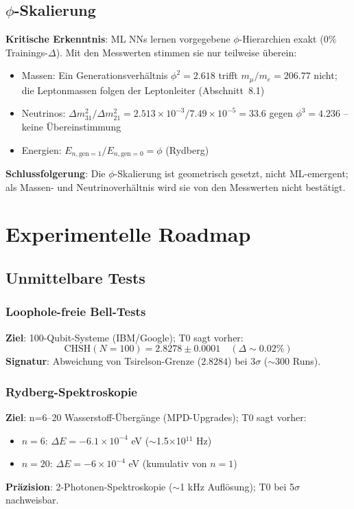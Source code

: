 	\subsection{$\phi$-Skalierung}
	
	\textbf{Kritische Erkenntnis}: ML NNs lernen vorgegebene $\phi$-Hierarchien exakt (0\% Trainings-$\Delta$). Mit den Messwerten stimmen sie nur teilweise überein:
	\begin{itemize}
		\item Massen: Ein Generationsverhältnis $\phi^2 = 2.618$ trifft $m_\mu/m_e = 206.77$ nicht; die Leptonmassen folgen der Leptonleiter (Abschnitt~8.1)
		\item Neutrinos: $\Delta m_{31}^2/\Delta m_{21}^2 = 2.513\times10^{-3}/7.49\times10^{-5} = 33.6$ gegen $\phi^3 = 4.236$ -- keine Übereinstimmung
		\item Energien: $E_{n,\text{gen}=1} / E_{n,\text{gen}=0} = \phi$ (Rydberg)
	\end{itemize}
	\textbf{Schlussfolgerung}: Die $\phi$-Skalierung ist geometrisch gesetzt, nicht ML-emergent; als Massen- und Neutrinoverhältnis wird sie von den Messwerten nicht bestätigt.
	
	\section{Experimentelle Roadmap}
	
	\subsection{Unmittelbare Tests}
	
	\subsubsection{Loophole-freie Bell-Tests}
	
	\textbf{Ziel}: 100-Qubit-Systeme (IBM/Google); T0 sagt vorher:
	\begin{equation}
		\text{CHSH}(N=100) = 2.8278 \pm 0.0001 \quad (\Delta \sim 0.02\%) \tag{ML-Gl.~6.1}
	\end{equation}
	\textbf{Signatur}: Abweichung von Tsirelson-Grenze ($2.8284$) bei $3\sigma$ ($\sim300$ Runs).
	
	\subsubsection{Rydberg-Spektroskopie}
	
	\textbf{Ziel}: n=6--20 Wasserstoff-Übergänge (MPD-Upgrades); T0 sagt vorher:
	\begin{itemize}
		\item $n=6$: $\Delta E = -6.1\times10^{-4}$ eV ($\sim$1.5$\times$10$^{11}$ Hz)
		\item $n=20$: $\Delta E = -6\times10^{-4}$ eV (kumulativ von $n=1$)
	\end{itemize}
	\textbf{Präzision}: 2-Photonen-Spektroskopie ($\sim$1 kHz Auflösung); T0 bei 5$\sigma$ nachweisbar.
	
